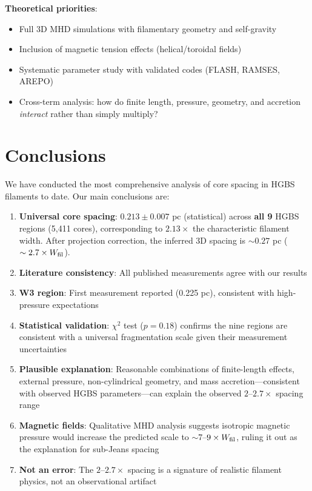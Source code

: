 \documentclass[11pt,a4paper]{article}
\begin{document}
\textbf{Theoretical priorities}:
\begin{itemize}
    \item Full 3D MHD simulations with filamentary geometry and self-gravity
    \item Inclusion of magnetic tension effects (helical/toroidal fields)
    \item Systematic parameter study with validated codes (FLASH, RAMSES, AREPO)
    \item Cross-term analysis: how do finite length, pressure, geometry, and accretion \textit{interact} rather than simply multiply?
\end{itemize}

\section{Conclusions}

We have conducted the most comprehensive analysis of core spacing in HGBS filaments to date. Our main conclusions are:

\begin{enumerate}
    \item \textbf{Universal core spacing}: $0.213 \pm 0.007$ pc (statistical) across \textbf{all 9} HGBS regions (5,411 cores), corresponding to $2.13\times$ the characteristic filament width. After projection correction, the inferred 3D spacing is $\sim0.27$ pc ($\sim2.7\times W_{\rm fil}$).
    \item \textbf{Literature consistency}: All published measurements agree with our results
    \item \textbf{W3 region}: First measurement reported (0.225 pc), consistent with high-pressure expectations
    \item \textbf{Statistical validation}: $\chi^2$ test ($p=0.18$) confirms the nine regions are consistent with a universal fragmentation scale given their measurement uncertainties
    \item \textbf{Plausible explanation}: Reasonable combinations of finite-length effects, external pressure, non-cylindrical geometry, and mass accretion—consistent with observed HGBS parameters—can explain the observed $2$--$2.7\times$ spacing range
    \item \textbf{Magnetic fields}: Qualitative MHD analysis suggests isotropic magnetic pressure would increase the predicted scale to $\sim7$--$9\times W_{\rm fil}$, ruling it out as the explanation for sub-Jeans spacing
    \item \textbf{Not an error}: The $2$--$2.7\times$ spacing is a signature of realistic filament physics, not an observational artifact
\end{enumerate}
\end{document}
